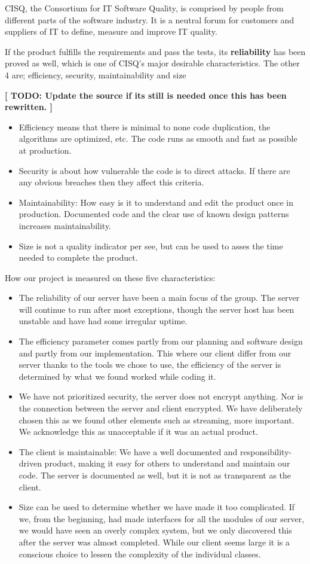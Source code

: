 CISQ, the Consortium for IT Software Quality, is comprised by people from different parts of the software industry. It is a neutral forum for customers and suppliers of IT to define, measure and improve IT quality.

If the product fulfills the requirements and pass the tests, its \textbf{reliability} has been proved as well, which is one of CISQ's  major desirable characteristics. The other 4 are; efficiency, security, maintainability and size \cite{CISQ}

\textbf{[ TODO: Update the source if its still is needed once this has been rewritten. ]}

\begin{itemize}
	\item Efficiency means that there is minimal to none code duplication, the algorithms are optimized, etc. The code runs as smooth and fast as possible at production.
	\item Security is about how vulnerable the code is to direct attacks. If there are any obvious breaches then they affect this criteria.
	\item Maintainability: How easy is it to understand and edit the product once in production. Documented code and the clear use of known design patterns increases maintainability. 
	\item Size is not a quality indicator per see, but can be used to asses the time needed to complete the product.
\end{itemize}

How our project is measured on these five characteristics:
\begin{itemize}
 	\item The reliability of our server have been a main focus of the group. The server will continue to run after most exceptions, though the server host has been unstable and have had some irregular uptime.
 	\item The efficiency parameter comes partly from our planning and software design and partly from our implementation. This where our client differ from our server thanks to the tools we chose to use, the efficiency of the server is determined by what we found worked while coding it.
 	\item We have not prioritized security, the server does not encrypt anything. Nor is the connection between the server and client encrypted. We have deliberately chosen this as we found other elements such as streaming, more important. We acknowledge this as unacceptable if it was an actual product.  
 	\item The client is maintainable: We have a well documented and responsibility-driven product, making it easy for others to understand and maintain our code. The server is documented as well, but it is not as transparent as the client.
	\item Size can be used to determine whether we have made it too complicated. If we, from the beginning, had made interfaces for all the modules of our server, we would have seen an overly complex system, but we only discovered this after the server was almost completed. While our client seems large it is a conscious choice to lessen the complexity of the individual classes.  
\end{itemize}
\newpage